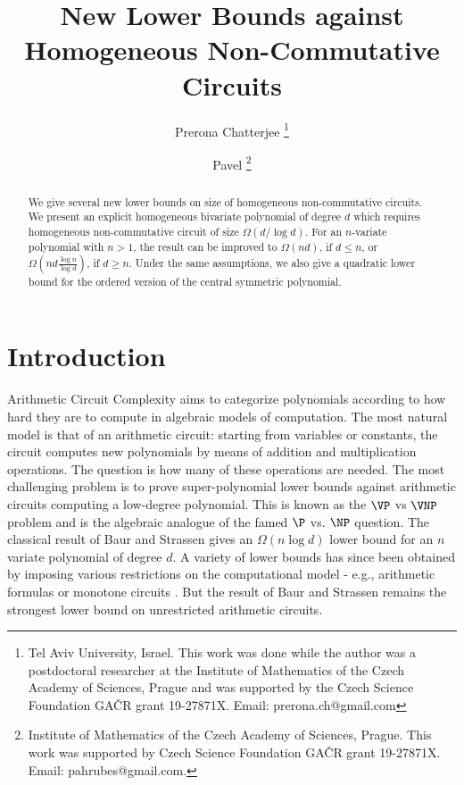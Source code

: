 \documentclass[11pt]{article}
\title{New Lower Bounds against Homogeneous Non-Commutative Circuits}
\author{Prerona Chatterjee
  \footnote{Tel Aviv University, Israel. This work was done while the author was a postdoctoral researcher at the Institute of Mathematics of the Czech Academy of Sciences, Prague and was supported by the Czech Science Foundation GA{\v C}R grant 19-27871X. Email: prerona.ch@gmail.com}
\and 
Pavel \Hrubes
  \footnote{Institute of Mathematics of the Czech Academy of Sciences, Prague. This work was supported by Czech Science Foundation GA{\v C}R grant 19-27871X. Email: pahrubes@gmail.com.}
}
\newcommand{\an}[1]{\textcolor{red}{#1}}
\begin{document}
\maketitle

\begin{abstract}  
  We give several new lower bounds on size of homogeneous non-commutative circuits. We present an explicit homogeneous bivariate polynomial of degree $d$ which requires homogeneous non-commutative circuit of size $\Omega(d/\log d)$. For an $n$-variate polynomial with $n>1$, the result can be improved to $\Omega(nd)$, if $d\leq n$,  or $\Omega(nd \frac{\log n}{\log d})$, if $d\geq n$.
  Under the same assumptions, we also give a quadratic lower bound for the ordered version of the central symmetric polynomial.   
\end{abstract}


\section{Introduction}


Arithmetic Circuit Complexity aims to categorize  polynomials according to how hard they are to compute in  algebraic models of computation.
The most natural model is that of an arithmetic circuit: starting from variables or constants, the circuit computes new polynomials by means of addition and multiplication operations. 
The question is how many of these operations are needed. The most challenging problem is to prove super-polynomial lower bounds against arithmetic circuits computing a low-degree polynomial.
This is known as the $\VP$ vs $\VNP$ problem and is the algebraic analogue of the famed $\P$ vs. $\NP$ question.  
The classical result of Baur and Strassen \cite{Str73, BS83} gives an $\Omega(n\log d)$ lower bound for an $n$ variate polynomial of degree $d$. 
A variety of lower bounds has since been obtained by imposing various restrictions on the computational model - e.g., arithmetic formulas or monotone circuits \cite{Kal85, Val80}. 
But the result of Baur and Strassen remains the strongest lower bound on unrestricted arithmetic circuits. 
\end{document}
